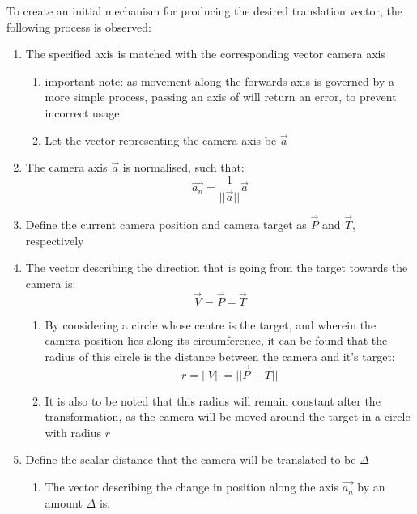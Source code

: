 To create an initial mechanism for producing the desired translation vector, the following process is observed:
\begin{enumerate}
    \item The specified axis is matched with the corresponding vector camera axis
    \begin{enumerate}
        \item important note: as movement along the forwards axis is governed by a more simple process, passing an axis of  will return an error, to prevent incorrect usage.
        \item Let the vector representing the camera axis be $\vec{a}$
    \end{enumerate}
    \item The camera axis $\vec{a}$ is normalised, such that:
    \begin{equation}
        \vec{a_n} = \frac{1}{||\vec{a}||}\vec{a}
    \end{equation}
    \item Define the current camera position and camera target as $\vec{P}$ and $\vec{T}$, respectively
    \item The vector describing the direction that is going from the target towards the camera is:
    \begin{equation}
        \vec{V} = \vec{P} - \vec{T}
    \end{equation}
    \begin{enumerate}
        \item By considering a circle whose centre is the target, and wherein the camera position lies along its circumference, it can be found that the radius of this circle is the distance between the camera and it's target:
        \begin{equation}
            r = ||V|| = ||\vec{P} - \vec{T}||
        \end{equation}
        \item It is also to be noted that this radius will remain constant after the transformation, as the camera will be moved around the target in a circle with radius $r$
    \end{enumerate}
    \item Define the scalar distance that the camera will be translated to be $\Delta$
    \begin{enumerate}
        \item The vector describing the change in position along the axis $\vec{a_n}$ by an amount $\Delta$ is:
        \begin{equation}

\end{equation}
\end{enumerate}
\end{enumerate}
